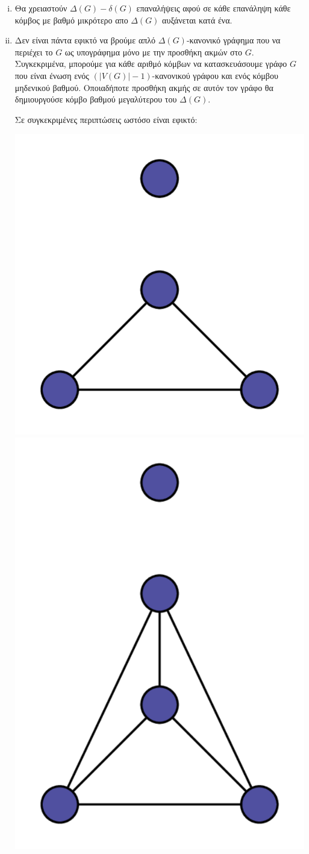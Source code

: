 \begin{enumerate}[i.]

\item
Θα χρειαστούν $\Delta(G)-\delta(G)$ επαναλήψεις αφού σε κάθε επανάληψη κάθε κόμβος με βαθμό μικρότερο απο $\Delta(G)$ αυξάνεται κατά ένα.

\item
Δεν είναι πάντα εφικτό να βρούμε απλό $\Delta(G)$-κανονικό γράφημα που να περιέχει το $G$ ως υπογράφημα
μόνο με την προσθήκη ακμών στο $G$. Συγκεκριμένα, μπορούμε για κάθε αριθμό κόμβων να κατασκευάσουμε γράφο $G$
        που είναι ένωση ενός $(|V(G)|-1)$-κανονικού γράφου και ενός κόμβου μηδενικού βαθμού. Οποιαδήποτε προσθήκη ακμής σε αυτόν
τον γράφο θα δημιουργούσε κόμβο βαθμού μεγαλύτερου του $\Delta(G)$.

Σε συγκεκριμένες περιπτώσεις ωστόσο είναι εφικτό:

\begin{center}
    \includegraphics[width=.23\textwidth]{./exercise4/diagrams/d1.png} \hspace{3cm}
    \includegraphics[width=.23\textwidth]{./exercise4/diagrams/d2.png} 
\end{center}

\end{enumerate}


